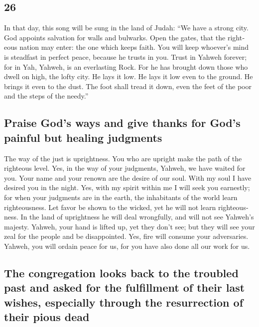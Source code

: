 \begin{paracol}{2}
\begin{otherlanguage}{english}
\hypertarget{section-51}{%
\section{26}\label{section-51}}

 In that day, this song will be sung in the land of Judah:
``We have a strong city. God appoints salvation for walls and bulwarks.
 Open the gates, that the righteous nation may enter: the
one which keeps faith.  You will keep whoever's mind is
steadfast in perfect peace, because he trusts in you. 
Trust in Yahweh forever; for in Yah, Yahweh, is an everlasting Rock.
 For he has brought down those who dwell on high, the
lofty city. He lays it low. He lays it low even to the ground. He brings
it even to the dust.  The foot shall tread it down, even
the feet of the poor and the steps of the needy.''

\hypertarget{praise-gods-ways-and-give-thanks-for-gods-painful-but-healing-judgments}{%
\subsection{Praise God's ways and give thanks for God's painful but
healing
judgments}\label{praise-gods-ways-and-give-thanks-for-gods-painful-but-healing-judgments}}

 The way of the just is uprightness. You who are upright
make the path of the righteous level.  Yes, in the way of
your judgments, Yahweh, we have waited for you. Your name and your
renown are the desire of our soul.  With my soul I have
desired you in the night. Yes, with my spirit within me I will seek you
earnestly; for when your judgments are in the earth, the inhabitants of
the world learn righteousness.  Let favor be shown to the
wicked, yet he will not learn righteousness. In the land of uprightness
he will deal wrongfully, and will not see Yahweh's majesty.
 Yahweh, your hand is lifted up, yet they don't see; but
they will see your zeal for the people and be disappointed. Yes, fire
will consume your adversaries.  Yahweh, you will ordain
peace for us, for you have also done all our work for us.

\hypertarget{the-congregation-looks-back-to-the-troubled-past-and-asked-for-the-fulfillment-of-their-last-wishes-especially-through-the-resurrection-of-their-pious-dead}{%
\subsection{The congregation looks back to the troubled past and asked
for the fulfillment of their last wishes, especially through the
resurrection of their pious
dead}\label{the-congregation-looks-back-to-the-troubled-past-and-asked-for-the-fulfillment-of-their-last-wishes-especially-through-the-resurrection-of-their-pious-dead}}


\end{otherlanguage}
\end{paracol}
